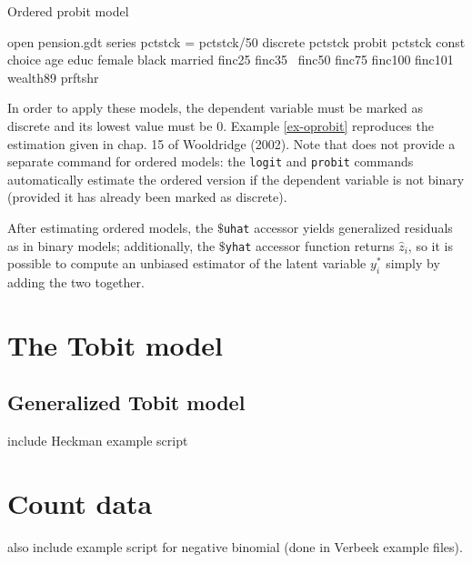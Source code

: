 \begin{script}[htbp]
  \caption{Ordered probit model}
  \label{ex-oprobit}
\begin{code}
open pension.gdt
series pctstck = pctstck/50
discrete pctstck
probit pctstck const choice age educ female black married finc25 finc35 \
  finc50 finc75 finc100 finc101 wealth89 prftshr
\end{code}
\end{script}

In order to apply these models, the dependent variable must be marked
as discrete and its lowest value must be 0. Example \ref{ex-oprobit}
reproduces the estimation given in chap. 15 of Wooldridge (2002). Note
that \app{gretl} does not provide a separate command for ordered
models: the \texttt{logit} and \texttt{probit} commands automatically
estimate the ordered version if the dependent variable is not binary
(provided it has already been marked as discrete).

After estimating ordered models, the \texttt{$\$$uhat} accessor yields
generalized residuals as in binary models; additionally, the
\texttt{$\$$yhat} accessor function returns $\hat{z}_i$, so it is
possible to compute an unbiased estimator of the latent variable
$y^*_i$ simply by adding the two together.

\section{The Tobit model}
\label{sec:tobit}

\subsection{Generalized Tobit model}
\label{sec:heckit}

include Heckman example script

\section{Count data}
\label{sec:poisson}

also include example script for negative binomial (done in Verbeek
example files).



